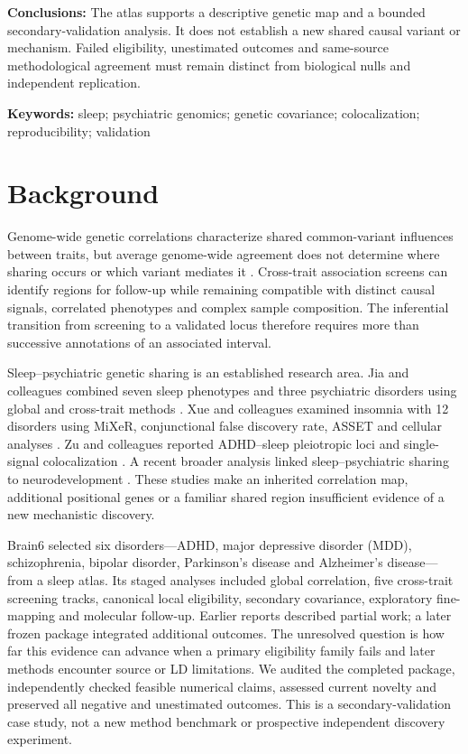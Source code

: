 \documentclass[11pt]{article}
\begin{document}
\textbf{Conclusions:} The atlas supports a descriptive genetic map and a bounded secondary-validation analysis. It does not establish a new shared causal variant or mechanism. Failed eligibility, unestimated outcomes and same-source methodological agreement must remain distinct from biological nulls and independent replication.

\textbf{Keywords:} sleep; psychiatric genomics; genetic covariance; colocalization; reproducibility; validation

\section*{Background}
Genome-wide genetic correlations characterize shared common-variant influences between traits, but average genome-wide agreement does not determine where sharing occurs or which variant mediates it \cite{ldsc,lava}. Cross-trait association screens can identify regions for follow-up while remaining compatible with distinct causal signals, correlated phenotypes and complex sample composition. The inferential transition from screening to a validated locus therefore requires more than successive annotations of an associated interval.

Sleep--psychiatric genetic sharing is an established research area. Jia and colleagues combined seven sleep phenotypes and three psychiatric disorders using global and cross-trait methods \cite{jia}. Xue and colleagues examined insomnia with 12 disorders using MiXeR, conjunctional false discovery rate, ASSET and cellular analyses \cite{xue}. Zu and colleagues reported ADHD--sleep pleiotropic loci and single-signal colocalization \cite{zu}. A recent broader analysis linked sleep--psychiatric sharing to neurodevelopment \cite{lin}. These studies make an inherited correlation map, additional positional genes or a familiar shared region insufficient evidence of a new mechanistic discovery.

Brain6 selected six disorders---ADHD, major depressive disorder (MDD), schizophrenia, bipolar disorder, Parkinson's disease and Alzheimer's disease---from a sleep atlas. Its staged analyses included global correlation, five cross-trait screening tracks, canonical local eligibility, secondary covariance, exploratory fine-mapping and molecular follow-up. Earlier reports described partial work; a later frozen package integrated additional outcomes. The unresolved question is how far this evidence can advance when a primary eligibility family fails and later methods encounter source or LD limitations. We audited the completed package, independently checked feasible numerical claims, assessed current novelty and preserved all negative and unestimated outcomes. This is a secondary-validation case study, not a new method benchmark or prospective independent discovery experiment.
\end{document}
